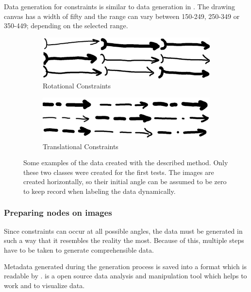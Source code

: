 Data generation for constraints is similar to data generation in \cite{Lawrence2020}.
The drawing canvas has a width of fifty and the range can vary between 150-249, 250-349 or 350-449; depending on the selected range.

\begin{figure}
    \centering
    \begin{subfigure}[b]{0.45\textwidth}
        \includegraphics[width=\textwidth]{images/rs.png}
        \caption{Rotational Constraints}
        \label{fig:rotational_constraints}
    \end{subfigure}
    \begin{subfigure}[b]{0.45\textwidth}
        \includegraphics[width=\textwidth]{images/ts.png}
        \caption{Translational Constraints}
        \label{fig:translational_constraints}
    \end{subfigure}
    \caption[Examples of constraint detector training data]{Some examples of the data created with the described method. Only these two classes were created for the first tests. The images are created horizontally, so their initial angle can be assumed to be zero to keep record when labeling the data dynamically. }
    \label{fig:generated_data_samples}
\end{figure}

\subsubsection{Preparing nodes on images}

Since constraints can occur at all possible angles, the data must be generated in such a way that it resembles the reality the most.
Because of this, multiple steps have to be taken to generate comprehensible data.

Metadata generated during the generation process is saved into a format which is readable by . %
 is a open source data analysis and manipulation tool which helps to work and to visualize data.

